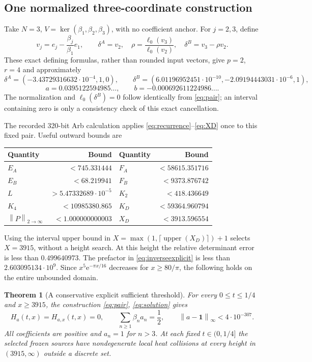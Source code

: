 \documentclass[11pt]{article}
\newtheorem{theorem}{Theorem}[section]
\theoremstyle{remark}\newtheorem{remark}[theorem]{Remark}
\newcommand{\norm}[1]{\left\lVert #1\right\rVert}
\newcommand{\e}{\mathrm e}
\begin{document}
\subsection{One normalized three-coordinate construction}
Take $N=3$, $V=\ker(\beta_1,\beta_2,\beta_3)$, with no coefficient anchor. For $j=2,3$, define
\begin{equation}\label{eq:pair}
 v_j=e_j-\frac{\beta_j}{\beta_1}e_1,\qquad
 \delta^A=v_2,\quad \rho=\frac{\ell_0(v_3)}{\ell_0(v_2)},\quad
 \delta^B=v_3-\rho v_2.
\end{equation}
These exact defining formulas, rather than rounded input vectors, give $p=2$, $r=4$ and approximately
\[
 \delta^A=(-3.43729316632\cdot10^{-4},1,0),\qquad
 \delta^B=(6.01196952451\cdot10^{-10},-2.09194443031\cdot10^{-6},1),
\]
\[
 a=0.0395122594985\ldots,\qquad b=-0.000692611224986\ldots.
\]
The normalization and $\ell_0(\delta^B)=0$ follow identically from \eqref{eq:pair}; an interval containing zero is only a consistency check of this exact cancellation.

The recorded 320-bit Arb calculation applies \eqref{eq:recurrence}--\eqref{eq:XD} once to this fixed pair. Useful outward bounds are
\begin{center}
\begin{tabular}{@{}lr@{\qquad}lr@{}}
\toprule
Quantity & Bound & Quantity & Bound\\\midrule
$E_A$ & $<745.331444$ & $F_A$ & $<58615.351716$\\
$E_B$ & $<68.219941$ & $F_B$ & $<9373.876742$\\
$L$ & $>5.47332689\cdot10^{-5}$ & $K_2$ & $<418.436649$\\
$K_4$ & $<10985380.865$ & $K_D$ & $<59364.960794$\\
$\norm P_{2\to\infty}$ & $<1.000000000003$ & $X_D$ & $<3913.596554$\\\bottomrule
\end{tabular}
\end{center}
Using the interval upper bound in $X=\max(1,\lceil\operatorname{upper}(X_D)\rceil)+1$ selects $X=3915$, without a height search. At this height the relative determinant error is less than $0.499640973$. The prefactor in \eqref{eq:inverseexplicit} is less than $2.603095134\cdot10^9$. Since $x^5\e^{-\pi x/16}$ decreases for $x\ge80/\pi$, the following holds on the entire unbounded domain.

\begin{theorem}[A conservative explicit sufficient threshold]\label{thm:3915}
For every $0\le t\le1/4$ and $x\ge3915$, the construction \eqref{eq:pair}, \eqref{eq:solution} gives
\[
 H_a(t,x)=H_{a,x}(t,x)=0,\qquad
 \sum_{n\ge1}\beta_na_n=\frac12,\qquad
 \norm{a-\mathbf1}_\infty<4\cdot10^{-307}.
\]
All coefficients are positive and $a_n=1$ for $n>3$. At each fixed $t\in(0,1/4]$ the selected frozen sources have nondegenerate local heat collisions at every height in $(3915,\infty)$ outside a discrete set.
\end{theorem}
\end{document}
